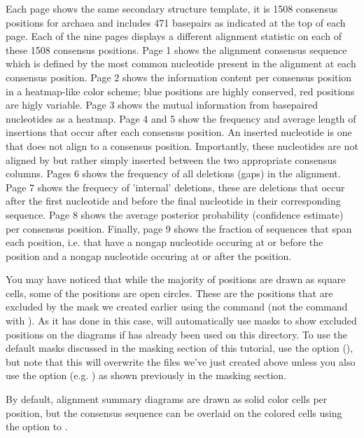 Each page shows the same secondary structure template, it is 1508
consensus positions for archaea and includes 471 basepairs as
indicated at the top of each page. Each of the nine pages displays a
different alignment statistic on each of these 1508 consensus
positions. Page 1 shows the alignment consensus sequence which is
defined by the most common nucleotide present in the alignment
 at each consensus position. Page 2 shows the
information content per consensus position in a heatmap-like color
scheme; blue positions are highly conserved, red positions are higly
variable. Page 3 shows the mutual information from basepaired nucleotides
as a heatmap. Page 4 and 5 show the frequency and average length of
insertions that occur after each consensus position. An inserted nucleotide
is one that does not align to a consensus position. Importantly, these
nucleotides are not aligned by  but rather simply
inserted between the two appropriate consensus columns. Pages 6 
shows the frequency of all deletions (gaps) in the alignment. Page 7
shows the frequecy of 'internal' deletions, these are deletions that
occur after the first nucleotide and before the final nucleotide in
their corresponding sequence. Page 8 shows the average posterior
probability (confidence estimate) per consensus position. Finally,
page 9 shows the fraction of sequences that span each position,
i.e. that have a nongap nucleotide occuring at or before the
position and a nongap nucleotide occuring at or after the
position. 

You may have noticed that while the majority of positions are drawn as
square cells, some of the positions are open circles. These are the
positions that are excluded by the mask we created earlier using the
command  (not the command with
). As it has done in this case,  will
automatically use masks to show excluded positions on the diagrams if
 has already been used on this directory. To use the
default masks discussed in the masking section of this tutorial, use 
the  option (), but note that this
will overwrite the files we've just created above unless you also use
the  option (e.g. ) as shown previously in the masking section.

By default, alignment summary diagrams are drawn as solid
color cells per position, but the consensus sequence can be overlaid
on the colored cells using the  option to .

